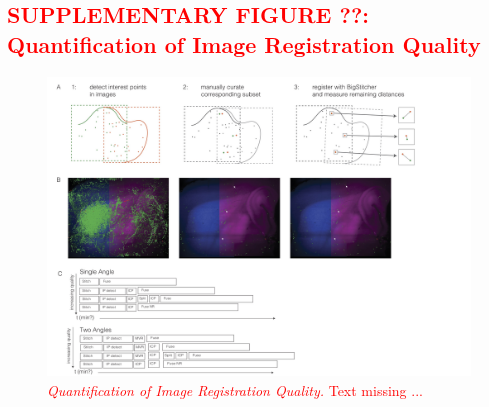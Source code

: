 \documentclass[]{spie}  %
\def\red{\textcolor{red}}
\begin{document}
\subsection*{\red{SUPPLEMENTARY FIGURE ??: Quantification of Image Registration Quality}}
\vspace{1mm}
\begin{figure}[h!]
\includegraphics[width=\textwidth]{bigstitcher_registrationquality.jpg}
\vspace{-2.0mm}
\caption{\hspace{-0.5mm} \red{\emph{Quantification of Image Registration Quality.} Text missing ...
}}
\label{fig:sup-fig-registration-quality}
\end{figure}

\pagebreak
\end{document}
